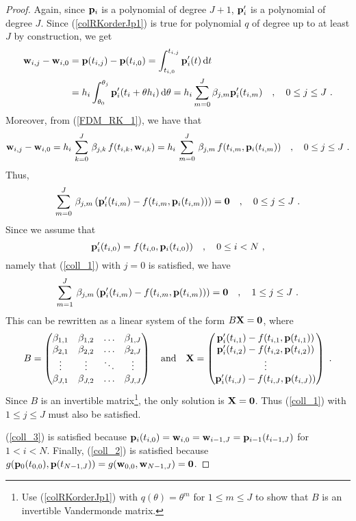 \begin{proof}
Again, since $\mathbf{p}_i$ is a polynomial of degree $J+1$, $\mathbf{p}_i'$
is a polynomial of degree $J$.  Since (\ref{colRKorderJp1}) 
is true for polynomial $q$ of degree up to at least $J$ by construction,
we get
\begin{align*}
\mathbf{w}_{i,j} - \mathbf{w}_{i,0} &= \mathbf{p}(t_{i,j}) - \mathbf{p}(t_{i,0})
= \int_{t_{i,0}}^{t_{i,j}} \mathbf{p}_i'(t) \,\mathrm{d}t \\
&= h_i \int_{\theta_0}^{\theta_j} \mathbf{p}_i'(t_i+\theta h_i) \,\mathrm{d}\theta
= h_i \sum_{m=0}^J \beta_{j,m}\mathbf{p}_i'(t_{i,m}) \quad , \quad
0 \leq j \leq J \ .
\end{align*}
Moreover, from (\ref{FDM_RK_1}), we have that
\[
\mathbf{w}_{i,j}- \mathbf{w}_{i,0} =
h_i\,\sum_{k=0}^J\,\beta_{j,k}\,f(t_{i,k},\mathbf{w}_{i,k})
= h_i\,\sum_{m=0}^J\,\beta_{j,m}\,f(t_{i,m},\mathbf{p}_i(t_{i,m}))
\quad , \quad  0 \leq j\leq J \ .
\]
Thus,
\[
\sum_{m=0}^J\,\beta_{j,m}\left( \mathbf{p}_i'(t_{i,m}) -
f(t_{i,m},\mathbf{p}_i(t_{i,m})) \right) = \mathbf{0}
\quad , \quad  0 \leq j \leq J \ .
\]
Since we assume that
\[
\mathbf{p}_i'(t_{i,0}) = f(t_{i,0},\mathbf{p}_i(t_{i,0})) \quad , \quad
0 \leq i < N \ ,
\]
namely that (\ref{coll_1}) with $j=0$ is satisfied, we have
\[
\sum_{m=1}^J\,\beta_{j,m}\left( \mathbf{p}_i'(t_{i,m}) -
f(t_{i,m},\mathbf{p}(t_{i,m})) \right) = \mathbf{0}
\quad , \quad  1 \leq j \leq J \ .
\]
This can be rewritten as a linear system of the
form $B\mathbf{X}=\mathbf{0}$, where
\[
B = \begin{pmatrix}
\beta_{1,1} & \beta_{1,2} & \ldots & \beta_{1,J} \\
\beta_{2,1} & \beta_{2,2} & \ldots & \beta_{2,J} \\
 \vdots & \vdots & \ddots & \vdots \\
\beta_{J,1} & \beta_{J,2} & \ldots & \beta_{J,J}
\end{pmatrix}
\quad \text{and} \quad
\mathbf{X} = \begin{pmatrix}
  \mathbf{p}_i'(t_{i,1}) - f(t_{i,1},\mathbf{p}(t_{i,1})) \\
  \mathbf{p}_i'(t_{i,2}) - f(t_{i,2},\mathbf{p}(t_{i,2})) \\
  \vdots \\
  \mathbf{p}_i'(t_{i,J}) - f(t_{i,J},\mathbf{p}(t_{i,J}))
\end{pmatrix} \ .
\]
Since $B$ is an invertible matrix\footnote{Use (\ref{colRKorderJp1}) with
$q(\theta) = \theta^m$ for $1\leq m \leq J$ to show that $B$ is
an invertible Vandermonde matrix.}, the only solution is $\mathbf{X}= \mathbf{0}$.
Thus (\ref{coll_1}) with $1\leq j \leq J$ must also be satisfied.

(\ref{coll_3}) is satisfied because $\mathbf{p}_i(t_{i,0}) =
\mathbf{w}_{i,0} = \mathbf{w}_{i-1,J} = \mathbf{p}_{i-1}(t_{i-1,J})$ for
$1 < i < N$.  Finally, (\ref{coll_2}) is satisfied because
$g(\mathbf{p}_0(t_{0,0}),\mathbf{p}(t_{N-1,J})) =
g(\mathbf{w}_{0,0},\mathbf{w}_{N-1,J}) = \mathbf{0}$.
\end{proof}

